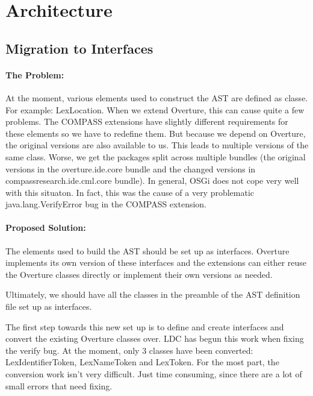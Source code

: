 \documentclass[11pt]{overturerep} \usepackage{t1enc,times,a4,t1enc}
\begin{document}
\chapter{Architecture}


\section{Migration to Interfaces} \label{sec:interfacemig}

    \subsubsection{The Problem:}

    At the moment, various elements used to construct the AST are defined as
    classe. For example: \textsf{LexLocation}. When we extend Overture, this
    can cause quite a few problems. The COMPASS extensions have slightly
    different requirements for these elements so we have to redefine them. But
    because we depend on Overture, the original versions are also available to
    us. This leads to multiple versions of the same class. Worse, we get the
    packages split across multiple bundles (the original versions in the
    overture.ide.core bundle and the changed versions in
    compassresearch.ide.cml.core bundle). In general, OSGi does not cope very
    well with this situaton. In fact, this was the cause of a very problematic
    \textsf{java.lang.VerifyError} bug in the COMPASS extension.




    \subsubsection{Proposed Solution:}
    
    The elements used to build the AST should be set up as interfaces. Overture
    implements its own version of these interfaces and the extensions can
    either reuse the Overture classes directly or implement their own versions
    as needed.

    Ultimately, we should have all the classes in the preamble of the AST
    definition file set up as interfaces.

    The first step towards this new set up is to define and create interfaces
    and convert the existing Overture classes over. LDC has begun this work
    when fixing the verify bug. At the moment, only 3 classes have been
    converted: \textsf{LexIdentifierToken}, \textsf{LexNameToken} and
    \textsf{LexToken}. For the most part, the conversion work isn't very
    difficult. Just time consuming, since there are a lot of small errors that
    need fixing.
    
\end{document}
